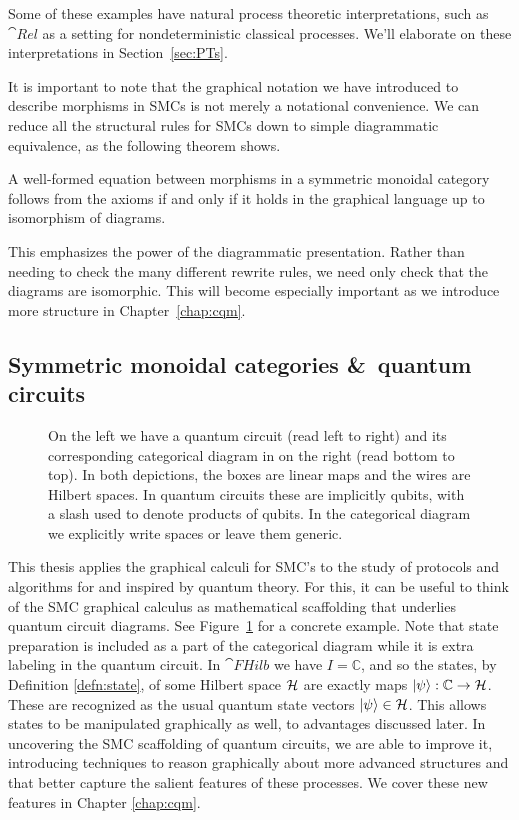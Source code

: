 Some of these examples have natural process theoretic interpretations, such as $\cat{Rel}$ as a setting for nondeterministic classical processes. We'll elaborate on these interpretations in Section~\ref{sec:PTs}.

It is important to note that the graphical notation we have introduced to describe morphisms in SMCs is not merely a notational convenience. We can reduce all the structural rules for SMCs down to simple diagrammatic equivalence, as the following theorem shows.

\begin{theorem}{\cite[Thm 2.3]{joyal1991geometry}}
A well-formed equation between morphisms in a symmetric monoidal category follows from the axioms if and only if it holds in the graphical language up to isomorphism of diagrams.
\end{theorem}

\noindent This emphasizes the power of the diagrammatic presentation.  Rather than needing to check the many different rewrite rules, we need only check that the diagrams are isomorphic.  This will become especially important as we introduce more structure in Chapter~\ref{chap:cqm}.

\subsection{Symmetric monoidal categories \&\ quantum circuits}
\label{sec:smcqc}
\begin{figure}[t]

\caption[Comparison of quantum circuits and symmetric monoidal diagrams]{On the left we have a quantum circuit (read left to right) and its corresponding categorical diagram in  on the right (read bottom to top). In both depictions, the boxes are linear maps and the wires are Hilbert spaces. In quantum circuits these are implicitly qubits, with a slash used to denote products of qubits. In the categorical diagram we explicitly write spaces or leave them generic.}
\label{fig:QCDSMC}
\end{figure}

This thesis applies the graphical calculi for SMC's to the study of protocols and algorithms for and inspired by quantum theory. For this, it can be useful to think of the SMC graphical calculus as mathematical scaffolding that underlies quantum circuit diagrams. See Figure~\ref{fig:QCDSMC} for a concrete example. Note that state preparation is included as a part of the categorical diagram while it is extra labeling in the quantum circuit. In $\cat{FHilb}$ we have $I=\mathbb{C}$, and so the states, by Definition \ref{defn:state}, of some Hilbert space $\mathcal{H}$ are exactly maps $| \psi \rangle:\mathbb{C}\to\mathcal{H}$. These are recognized as the usual quantum state vectors $| \psi \rangle\in\mathcal{H}$. This allows states to be manipulated graphically as well, to advantages discussed later. In uncovering the SMC scaffolding of quantum circuits, we are able to improve it, introducing techniques to reason graphically about more advanced structures and that better capture the salient features of these processes. We cover these new features in Chapter \ref{chap:cqm}.

